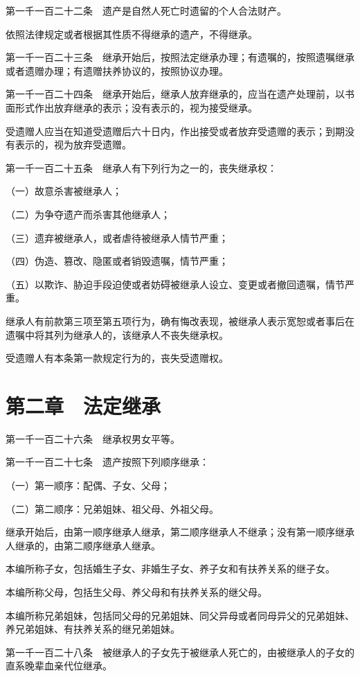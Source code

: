 \documentclass[UTF8,12pt,a4paper]{ctexbook}
\begin{document}
第一千一百二十二条　遗产是自然人死亡时遗留的个人合法财产。

依照法律规定或者根据其性质不得继承的遗产，不得继承。

第一千一百二十三条　继承开始后，按照法定继承办理；有遗嘱的，按照遗嘱继承或者遗赠办理；有遗赠扶养协议的，按照协议办理。

第一千一百二十四条　继承开始后，继承人放弃继承的，应当在遗产处理前，以书面形式作出放弃继承的表示；没有表示的，视为接受继承。

受遗赠人应当在知道受遗赠后六十日内，作出接受或者放弃受遗赠的表示；到期没有表示的，视为放弃受遗赠。

第一千一百二十五条　继承人有下列行为之一的，丧失继承权：

（一）故意杀害被继承人；

（二）为争夺遗产而杀害其他继承人；

（三）遗弃被继承人，或者虐待被继承人情节严重；

（四）伪造、篡改、隐匿或者销毁遗嘱，情节严重；

（五）以欺诈、胁迫手段迫使或者妨碍被继承人设立、变更或者撤回遗嘱，情节严重。

继承人有前款第三项至第五项行为，确有悔改表现，被继承人表示宽恕或者事后在遗嘱中将其列为继承人的，该继承人不丧失继承权。

受遗赠人有本条第一款规定行为的，丧失受遗赠权。

\section*{第二章　法定继承}

第一千一百二十六条　继承权男女平等。

第一千一百二十七条　遗产按照下列顺序继承：

（一）第一顺序：配偶、子女、父母；

（二）第二顺序：兄弟姐妹、祖父母、外祖父母。

继承开始后，由第一顺序继承人继承，第二顺序继承人不继承；没有第一顺序继承人继承的，由第二顺序继承人继承。

本编所称子女，包括婚生子女、非婚生子女、养子女和有扶养关系的继子女。

本编所称父母，包括生父母、养父母和有扶养关系的继父母。

本编所称兄弟姐妹，包括同父母的兄弟姐妹、同父异母或者同母异父的兄弟姐妹、养兄弟姐妹、有扶养关系的继兄弟姐妹。

第一千一百二十八条　被继承人的子女先于被继承人死亡的，由被继承人的子女的直系晚辈血亲代位继承。
\end{document}
